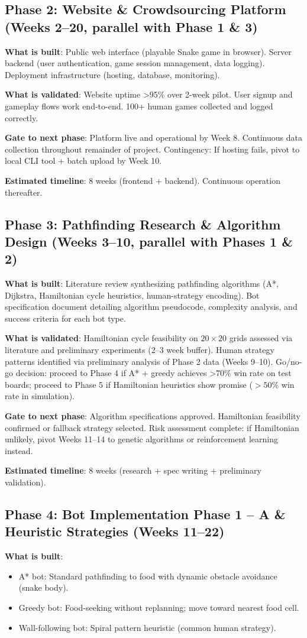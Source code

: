 \documentclass[11pt,a4paper]{article}
\begin{document}
\subsection*{Phase 2: Website \& Crowdsourcing Platform (Weeks 2--20, parallel with Phase 1 \& 3)}
\textbf{What is built}: Public web interface (playable Snake game in browser). Server backend (user authentication, game session management, data logging). Deployment infrastructure (hosting, database, monitoring).

\textbf{What is validated}: Website uptime >95\% over 2-week pilot. User signup and gameplay flows work end-to-end. 100+ human games collected and logged correctly.

\textbf{Gate to next phase}: Platform live and operational by Week 8. Continuous data collection throughout remainder of project. Contingency: If hosting fails, pivot to local CLI tool + batch upload by Week 10.

\textbf{Estimated timeline}: 8 weeks (frontend + backend). Continuous operation thereafter.

\subsection*{Phase 3: Pathfinding Research \& Algorithm Design (Weeks 3--10, parallel with Phases 1 \& 2)}
\textbf{What is built}: Literature review synthesizing pathfinding algorithms (A*, Dijkstra, Hamiltonian cycle heuristics, human-strategy encoding). Bot specification document detailing algorithm pseudocode, complexity analysis, and success criteria for each bot type.

\textbf{What is validated}: Hamiltonian cycle feasibility on $20 \times 20$ grids assessed via literature and preliminary experiments (2--3 week buffer). Human strategy patterns identified via preliminary analysis of Phase 2 data (Weeks 9--10). Go/no-go decision: proceed to Phase 4 if A* + greedy achieves >70\% win rate on test boards; proceed to Phase 5 if Hamiltonian heuristics show promise ($>50\%$ win rate in simulation).

\textbf{Gate to next phase}: Algorithm specifications approved. Hamiltonian feasibility confirmed or fallback strategy selected. Risk assessment complete: if Hamiltonian unlikely, pivot Weeks 11--14 to genetic algorithms or reinforcement learning instead.

\textbf{Estimated timeline}: 8 weeks (research + spec writing + preliminary validation).

\subsection*{Phase 4: Bot Implementation Phase 1 -- A\* \& Heuristic Strategies (Weeks 11--22)}
\textbf{What is built}: 
\begin{itemize}
    \item A* bot: Standard pathfinding to food with dynamic obstacle avoidance (snake body).
    \item Greedy bot: Food-seeking without replanning; move toward nearest food cell.
    \item Wall-following bot: Spiral pattern heuristic (common human strategy).
\end{itemize}
\end{document}
